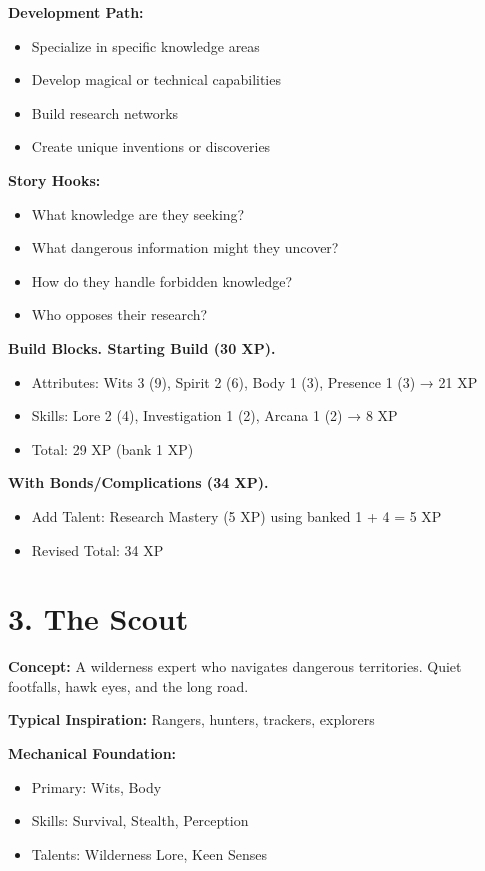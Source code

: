 \documentclass[11pt,twoside,openany]{book}
\begin{document}
\textbf{Development Path:}
\begin{itemize}
\item Specialize in specific knowledge areas
\item Develop magical or technical capabilities
\item Build research networks
\item Create unique inventions or discoveries
\end{itemize}

\textbf{Story Hooks:}
\begin{itemize}
\item What knowledge are they seeking?
\item What dangerous information might they uncover?
\item How do they handle forbidden knowledge?
\item Who opposes their research?
\end{itemize}

\textbf{Build Blocks. Starting Build (30 XP).}
\begin{itemize}
\item Attributes: Wits 3 (9), Spirit 2 (6), Body 1 (3), Presence 1 (3) → 21 XP
\item Skills: Lore 2 (4), Investigation 1 (2), Arcana 1 (2) → 8 XP
\item Total: 29 XP (bank 1 XP)
\end{itemize}

\textbf{With Bonds/Complications (34 XP).}
\begin{itemize}
\item Add Talent: Research Mastery (5 XP) using banked 1 + 4 = 5 XP
\item Revised Total: 34 XP
\end{itemize}

\section*{3. The Scout} 

\textbf{Concept:} A wilderness expert who navigates dangerous territories. Quiet footfalls, hawk eyes, and the long road.

\textbf{Typical Inspiration:} Rangers, hunters, trackers, explorers

\textbf{Mechanical Foundation:}
\begin{itemize}
\item Primary: Wits, Body
\item Skills: Survival, Stealth, Perception
\item Talents: Wilderness Lore, Keen Senses
\end{itemize}
\end{document}
